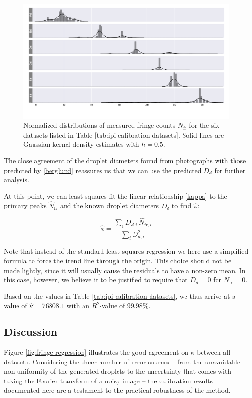 \documentclass[10pt]{book}
\begin{document}
\begin{figure}
    \centering
    \includegraphics[width=\textwidth]{img/fringe_histogram.pdf}
    \caption{Normalized distributions of measured fringe counts $N_\text{fr}$
        for the six datasets listed in Table \ref{tab:ipi-calibration-datasets}. Solid lines are
Gaussian kernel density estimates with $h=0.5$. }
    \label{fig:fringe-histograms}
\end{figure}

The close agreement of the droplet diameters found from photographs with those
predicted by \eqref{berglund} reassures us that we can use the predicted $D_d$
for further analysis.

At this point, we can least-squares-fit the linear relationship \eqref{kappa} to the primary
peaks $\hat{N}_\text{fr}$ and the known droplet diameters $D_d$ to find
$\hat{\kappa}$:

\begin{equation}
    \hat{\kappa} = \frac{\sum_i D_{d,i} \, \hat{N}_{\text{fr}, i}}{\sum_i
    D_{d,i}^2}
\end{equation}

Note that instead of the standard least squares regression we here use a
simplified formula to force the trend line through the origin. This choice
should not be made lightly, since it will usually cause the residuals to have a
non-zero mean. In this case, however, we believe it to be justified to require
that $D_d = 0$ for $N_\text{fr} = 0$.

Based on the values in Table \ref{tab:ipi-calibration-datasets}, we thus arrive
at a value of $\hat{\kappa} = 76808.1$ with an $R^2$-value of 99.98\%. 

\subsection{Discussion}
Figure \ref{fig:fringe-regression} illustrates the good agreement on $\kappa$ between
all datasets. Considering the sheer number of error sources -- from the
unavoidable non-uniformity of the generated droplets to the uncertainty that
comes with taking the Fourier transform of a noisy image -- the calibration
results documented here are a testament to the practical robustness of the
method.
\end{document}
